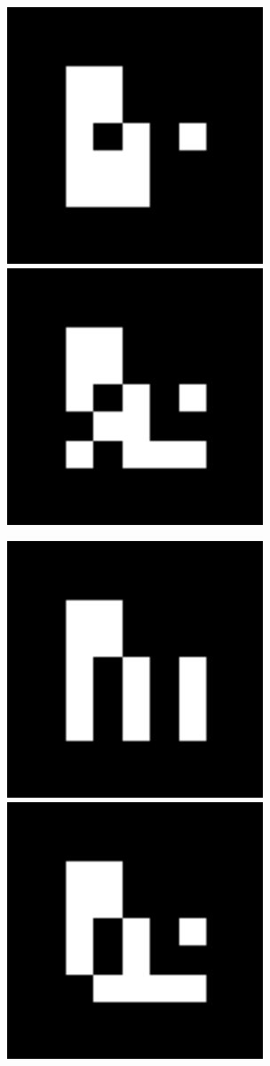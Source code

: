 \documentclass[10pt,letterpaper]{article}
\begin{document}
\includegraphics[width=3in]{MarkerData_153.png}
\includegraphics[width=3in]{MarkerData_154.png}


\includegraphics[width=3in]{MarkerData_155.png}
\includegraphics[width=3in]{MarkerData_156.png}
\end{document}
